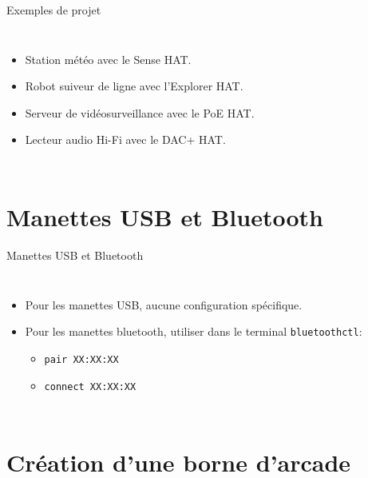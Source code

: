 \documentclass[aspectratio=169,xcolor=dvipsnames]{beamer}
\begin{document}
\begin{frame}{Exemples de projet}
    \begin{columns}[c] %

        \begin{itemize}
            \item Station météo avec le Sense HAT.
            \item Robot suiveur de ligne avec l’Explorer HAT.
            \item Serveur de vidéosurveillance avec le PoE HAT.
            \item Lecteur audio Hi-Fi avec le DAC+ HAT.
        \end{itemize}

    \end{columns}
\end{frame}

\section{Manettes USB et Bluetooth}

\begin{frame}{Manettes USB et Bluetooth}
    \begin{columns}[c] %

        \begin{itemize}
            \item Pour les manettes USB, aucune configuration spécifique.
            \item Pour les manettes bluetooth, utiliser dans le terminal \texttt{bluetoothctl}:
            \begin{itemize}
                \item \texttt{pair XX:XX:XX}
                \item \texttt{connect XX:XX:XX}
            \end{itemize}
        \end{itemize}

    \end{columns}
\end{frame}

\section{Création d'une borne d'arcade}
\end{document}
